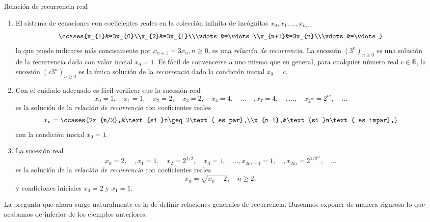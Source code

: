 \begin{example}{Relación de recurrencia real}\leavevmode
	\begin{enumerate}
		\item El sistema de ecuaciones con coeficientes reales en la colección infinita de incógnitas $x_{0},x_{1},\ldots,x_{n,\ldots}$ \[  \ccases{x_{1}&=3x_{0}\\x_{2}&=3x_{1}\\\vdots&=\vdots\\x_{n+1}&=3x_{n}\\\vdots&=\vdots} \] lo que puede indicarse más concisamente por $x_{n+1}=3x_{n},n\geq0$, es una \emph{relación de recurrencia}. La sucesión ${\left(3^{n}\right)}_{n\geq0}$ es una solución de la recurrencia dada con valor inicial $x_{0}=1$. Es fácil de convencerse a uno mismo que en general, para cualquier número real $c\in\mathds{R}$, la sucesión ${\left(c3^{n}\right)}_{n\geq0}$ es la única solución de la \emph{recurrencia} dado la condición inicial $x_{0}=c$.
		\item Con el cuidado adecuado es fácil verificar que la sucesión real \[ x_{0}=1,\quad x_{1}=1,\quad x_{2}=2,\quad x_{3}=2,\quad x_{4}=4,\quad\ldots\quad,x_{7}=4,\quad,\ldots,\quad x_{2^{m}}=2^{m},\quad\ldots \] es la solución de la \emph{relación de recurrencia} con coeficientes reales \[ x_{n}=\ccases{2x_{n/2},&\text{si }n\geq2\text{ es par},\\x_{n-1},&\text{si }n\text{ es impar},} \] con la condición inicial $x_{0}=1$.
		\item La sucesión real \[ x_{0}=2,\quad,x_{1}=1,\quad x_{2}=2^{1/2},\quad x_{3}=1,\quad\ldots,x_{2m-1}=1,\quad,x_{2m}=2^{1/2^{m}},\quad\ldots \] es la solución de la \emph{relación de recurrencia} con coeficientes reales \[ x_{n}=\sqrt{x_{n}-2},\quad n\geq2, \] y condiciones iniciales $x_{0}=2$ y $x_{1}=1$.
	\end{enumerate}
\end{example}

La pregunta que ahora surge naturalmente es la de definir relaciones generales de recurrencia. Buscamos exponer de manera rigurosa lo que acabamos de inferior de los ejemplos anteriores.

